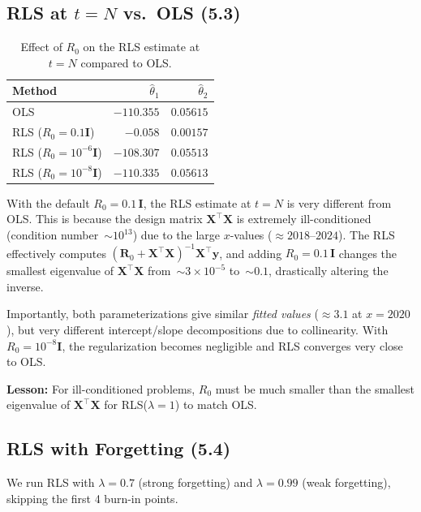 \documentclass[11pt,a4paper]{article}
\begin{document}
\subsection{RLS at $t=N$ vs.\ OLS (5.3)}

\begin{table}[H]
\centering
\begin{tabular}{lrr}
\toprule
Method & $\hat\theta_1$ & $\hat\theta_2$ \\
\midrule
OLS & $-110.355$ & $0.05615$ \\
RLS ($R_0=0.1\boldsymbol{I}$) & $-0.058$ & $0.00157$ \\
RLS ($R_0=10^{-6}\boldsymbol{I}$) & $-108.307$ & $0.05513$ \\
RLS ($R_0=10^{-8}\boldsymbol{I}$) & $-110.335$ & $0.05613$ \\
\bottomrule
\end{tabular}
\caption{Effect of $R_0$ on the RLS estimate at $t=N$ compared to OLS.}
\label{tab:rls_vs_ols}
\end{table}

With the default $R_0=0.1\,\boldsymbol{I}$, the RLS estimate at $t=N$ is very different from OLS.  This is because the design matrix $\boldsymbol{X}^\top\boldsymbol{X}$ is extremely ill-conditioned (condition number~$\sim\!10^{13}$) due to the large $x$-values ($\approx 2018$--$2024$).  The RLS effectively computes $(\boldsymbol{R}_0 + \boldsymbol{X}^\top\boldsymbol{X})^{-1}\boldsymbol{X}^\top\boldsymbol{y}$, and adding $R_0=0.1\,\boldsymbol{I}$ changes the smallest eigenvalue of $\boldsymbol{X}^\top\boldsymbol{X}$ from~$\sim\!3\times 10^{-5}$ to~$\sim\!0.1$, drastically altering the inverse.

Importantly, both parameterizations give similar \emph{fitted values} ($\approx 3.1$ at $x=2020$), but very different intercept/slope decompositions due to collinearity.  With $R_0 = 10^{-8}\boldsymbol{I}$, the regularization becomes negligible and RLS converges very close to OLS.

\textbf{Lesson:} For ill-conditioned problems, $R_0$ must be much smaller than the smallest eigenvalue of $\boldsymbol{X}^\top\boldsymbol{X}$ for RLS($\lambda=1$) to match OLS.

\subsection{RLS with Forgetting (5.4)}

We run RLS with $\lambda=0.7$ (strong forgetting) and $\lambda=0.99$ (weak forgetting), skipping the first 4 burn-in points.
\end{document}

